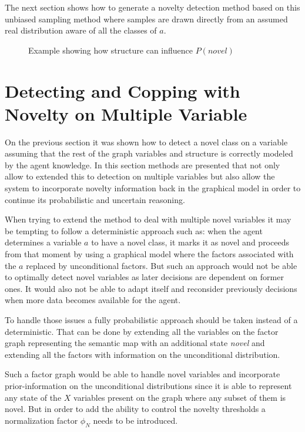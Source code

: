 The next section shows how to generate a novelty detection method based on this
unbiased sampling method where samples are drawn directly from an assumed real
distribution aware of all the classes of $a$.

\begin{figure}[h]
\caption{\label{fig:structure-influences-novelty}Example showing how
         structure can influence $P(novel)$}
\end{figure}


\section{Detecting and Copping with Novelty on Multiple Variable}


On the previous section it was shown how to detect a novel class on a variable
assuming that the rest of the graph variables and structure is correctly modeled
by the agent knowledge.
In this section methods are presented that not only allow to extended this to
detection on multiple variables but also allow the system to incorporate
novelty information back in the graphical model in order to continue its
probabilistic and uncertain reasoning.

When trying to extend the method to deal with multiple novel variables it may
be tempting to follow a deterministic approach such as:
when the agent determines a variable $a$ to have a novel class, it marks it as
novel and proceeds from that moment by using a graphical model where the factors
associated with the $a$ replaced by unconditional factors.
But such an approach would not be able to optimally detect novel variables
as later decisions are dependent on former ones.
It would also not be able to adapt itself and reconsider previously decisions
when more data becomes available for the agent.

To handle those issues a fully probabilistic approach should be taken
instead of a deterministic.
That can be done by extending all the variables on the factor graph representing
the semantic map with an additional state \emph{novel} and extending all the
factors with information on the unconditional distribution.

Such a factor graph would be able to handle novel variables and incorporate
prior-information on the unconditional distributions since it is able to
represent any state of the $X$ variables present on the graph where any
subset of them is novel. But in order to add the ability to control the
novelty thresholds a normalization factor $\phi_N$ needs to be introduced.

